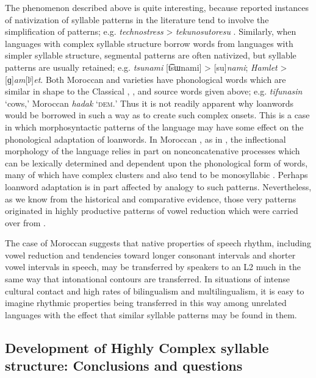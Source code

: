   The phenomenon described above is quite interesting, because reported instances of nativization of syllable patterns in the literature tend to involve the simplification of patterns; e.g.  \textit{technostress} >  \textit{tekunosutoresu} \citep[69]{Kay1995}. Similarly, when languages with complex syllable structure borrow words from languages with simpler syllable structure, segmental patterns are often nativized, but syllable patterns are usually retained; e.g.  \textit{tsunami} [t͡sɯnami] >  [su]\textit{nami};  \textit{Hamlet} >  [ɡ]\textit{am}[lʲ]\textit{et}. Both Moroccan  and  varieties have phonological words which are similar in shape to the Classical , , and  source words given above; e.g.  \textit{tifunasin} ‘cows,’ Moroccan  \textit{hadak} ‘\textsc{dem.}’ Thus it is not readily apparent why loanwords would be borrowed in such a way as to create such complex onsets. This is a case in which morphosyntactic patterns of the language may have some effect on the phonological adaptation of loanwords. In Moroccan , as in , the inflectional morphology of the language relies in part on nonconcatenative processes which can be lexically determined and dependent upon the phonological form of words, many of which have complex clusters and also tend to be monosyllabic \citep{Heath2007}. Perhaps loanword adaptation is in part affected by analogy to such patterns. Nevertheless, as we know from the historical and comparative evidence, those very patterns originated in highly productive patterns of vowel reduction which were carried over from .

  The case of Moroccan  suggests that native properties of speech rhythm, including vowel reduction and tendencies toward longer consonant intervals and shorter vowel intervals in speech, may be transferred by speakers to an L2 much in the same way that intonational contours are transferred. In situations of intense cultural contact and high rates of bilingualism and multilingualism, it is easy to imagine rhythmic properties being transferred in this way among unrelated languages with the effect that similar syllable patterns may be found in them.

\subsection{Development of Highly Complex syllable structure: Conclusions and questions}\label{sec:8.4.6}


